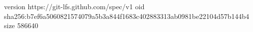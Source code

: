 version https://git-lfs.github.com/spec/v1
oid sha256:b7ef6a5060821574079a5b3a844f1683c402883313ab0981be22104d57b144b4
size 586640
